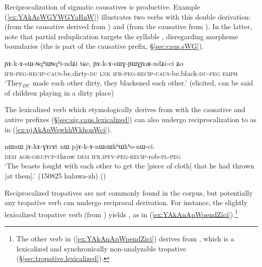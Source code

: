 Reciprocalization of sigmatic causatives is productive. Example (\ref{ex:YAkAsWGYWGYaRnW}) illustrates two verbs with this double derivation:  (from the causative   derived from ) and   (from the causative   from ). In the latter, note that partial reduplication targets the syllable , disregarding morpheme boundaries (the  is part of the causative prefix, §\ref{sec:caus.sWG}).

 \begin{exe}
\ex \label{ex:YAkAsWGYWGYaRnW}
\gll ɲɤ-k-ɤ-sɯ-ɴqʰɯ\redp{}ɴqʰi-ndʑi tɕe, ɲɤ-k-ɤ-sɯɣ-ɲɯ\redp{}ɣɲaʁ-ndʑi-ci ʑo \\
\textsc{ifr}-\textsc{peg}-\textsc{recip}-\textsc{caus}-be.dirty-\textsc{du} \textsc{lnk} \textsc{ifr}-\textsc{peg}-\textsc{recip}-\textsc{caus}-be.black-\textsc{du}-\textsc{peg} \textsc{emph} \\
\glt `They$_{DU}$ made each other dirty, they blackened each other.' (elicited, can be said of children playing in a dirty place)
\end{exe}

The lexicalized verb  which etymologically derives from  with the causative and autive prefixes (§\ref{sec:sig.caus.lexicalized}) can also undergo reciprocalization to  as in (\ref{ex:pjAkAnWswkhWkhonWci}).
 
 \begin{exe}
\ex \label{ex:pjAkAnWswkhWkhonWci}
\gll nɯnɯ jɤ-kɤ-ɣɤrɤt nɯ pjɤ-k-ɤ-nɯsɯkʰɯ\redp{}kʰo-nɯ-ci. \\
\textsc{dem} \textsc{aor}-\textsc{obj}:\textsc{pcp}-throw \textsc{dem} \textsc{ifr}.\textsc{ipfv}-\textsc{peg}-\textsc{recip}-rob-\textsc{pl}-\textsc{peg} \\
\glt `The beasts fought with each other to get the [piece of cloth] that he had thrown [at them].' (150825 huluwa-zh) ()
\end{exe}

Reciprocalized tropatives are not commonly found in the corpus, but potentially any tropative verb can undergo reciprocal derivation. For instance, the slightly lexicalized tropative verb  (from ) yields , as in (\ref{ex:YAkAnApWpendZici}).\footnote{The other verb  in (\ref{ex:YAkAnApWpendZici}) derives from , which is a lexicalized and synchronically non-analyzable tropative (§\ref{sec:tropative.lexicalized}). }

